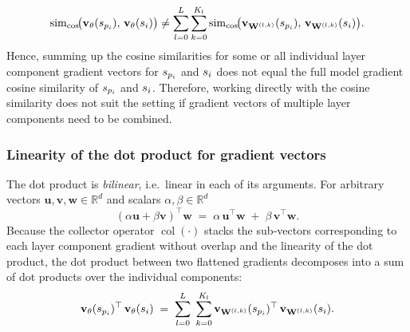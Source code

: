 \begin{equation}
\begin{split}
    \simcos\!\bigl(\vXspi,\,\vXsi\bigr) \neq \sum_{l=0}^{L} \sum_{k=0}^{K_l} \simcos\!\bigl( \vXspi[\Wlk], \, \vXsi[\Wlk] \bigr ).
    \label{eq:cosine_similarity_non_linearity_full}
\end{split}
\end{equation}
Hence, summing up the cosine similarities for some or all individual layer component gradient vectors for $s_{p_i}$ and $s_i$ does not equal the full model gradient cosine similarity of $s_{p_i}$ and $s_i$. Therefore, working directly with the cosine similarity does not suit the setting if gradient vectors of multiple layer components need to be combined. 

\subsubsection{Linearity of the dot product for gradient vectors}
The dot product is \emph{bilinear}, i.e.\ linear in each of its arguments.
For arbitrary vectors $\mathbf{u},\mathbf{v},\mathbf{w}\!\in\!\mathbb{R}^d$ and
scalars $\alpha,\beta\!\in\!\mathbb{R}^d$
\begin{equation}
  (\alpha\mathbf{u}+\beta\mathbf{v})^{\top}\mathbf{w}
  \;=\;
  \alpha\,\mathbf{u}^{\top}\mathbf{w}
  \;+\;
  \beta\,\mathbf{v}^{\top}\mathbf{w}.
  \label{eq:dot_bilinear}
\end{equation}
Because the collector operator $\operatorname{col}(\cdot)$ stacks the sub‑vectors corresponding to each layer component gradient without overlap and the linearity of the dot product, the dot product between two flattened gradients decomposes into a sum of dot products over the individual components:
\begin{equation}
  \vXspi^{\top}\,\vXsi
  \;=\;
  \sum_{l=0}^{L}\;
  \sum_{k=0}^{K_l}
    \vXspi[\Wlk]^{\top}\,
    \vXsi[\Wlk].
  \label{eq:dot_grad_decompose}
\end{equation}

